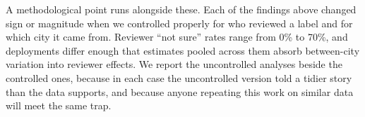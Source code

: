 A methodological point runs alongside these. Each of the findings above changed
sign or magnitude when we controlled properly for who reviewed a label and for
which city it came from. Reviewer ``not sure'' rates range from 0\% to 70\%,
and deployments differ enough that estimates pooled across them absorb
between-city variation into reviewer effects. We report the uncontrolled
analyses beside the controlled ones, because in each case the uncontrolled
version told a tidier story than the data supports, and because anyone repeating
this work on similar data will meet the same trap.

%
%
%
